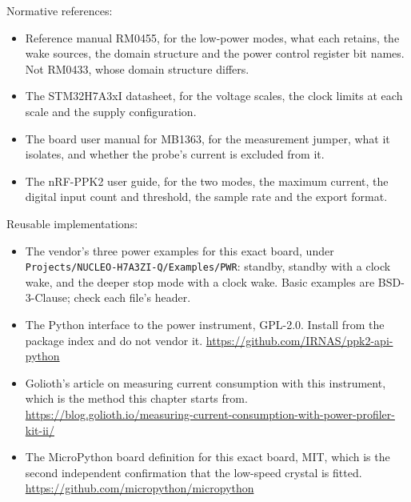 Normative references:
\begin{itemize}
\item Reference manual RM0455, for the low-power modes, what each retains, the
wake sources, the domain structure and the power control register bit names.
Not RM0433, whose domain structure differs.
\item The STM32H7A3xI datasheet, for the voltage scales, the clock limits at
each scale and the supply configuration.
\item The board user manual for MB1363, for the measurement jumper, what it
isolates, and whether the probe's current is excluded from it.
\item The nRF-PPK2 user guide, for the two modes, the maximum current, the
digital input count and threshold, the sample rate and the export format.
\end{itemize}

Reusable implementations:
\begin{itemize}
\item The vendor's three power examples for this exact board, under
\texttt{Projects/}\allowbreak\texttt{NUCLEO-H7A3ZI-Q/}\allowbreak\texttt{Examples/PWR}: standby, standby with a clock
wake, and the deeper stop mode with a clock wake. Basic examples are
BSD-3-Clause; check each file's header.
\item The Python interface to the power instrument, GPL-2.0. Install from the
package index and do not vendor it.\newline
\url{https://github.com/IRNAS/ppk2-api-python}
\item Golioth's article on measuring current consumption with this
instrument, which is the method this chapter starts from.\newline
\url{https://blog.golioth.io/measuring-current-consumption-with-power-profiler-kit-ii/}
\item The MicroPython board definition for this exact board, MIT, which is the
second independent confirmation that the low-speed crystal is fitted.\newline
\url{https://github.com/micropython/micropython}
\end{itemize}
